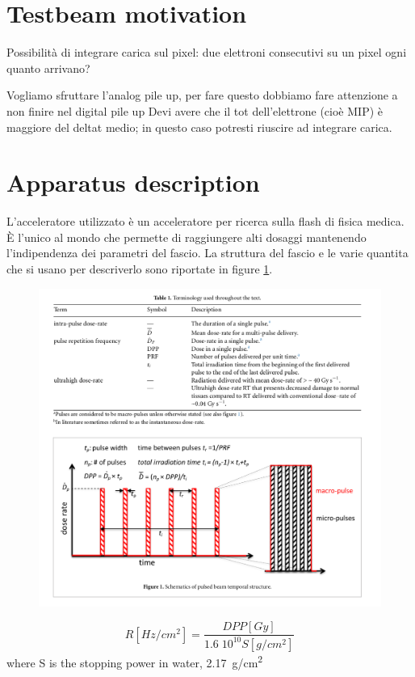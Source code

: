 \section{Testbeam motivation}
Possibilità di integrare carica sul pixel: due elettroni consecutivi su un pixel ogni quanto arrivano?

Vogliamo sfruttare l'analog pile up, per fare questo dobbiamo fare attenzione a non finire nel digital pile up
Devi avere che il tot dell'elettrone (cioè MIP) è maggiore del deltat medio; in questo caso potresti riuscire ad integrare carica.


\section{Apparatus description}
L'acceleratore utilizzato è un acceleratore per ricerca sulla flash di fisica medica. È l'unico al mondo che permette di raggiungere alti dosaggi mantenendo l'indipendenza dei parametri del fascio. La struttura del fascio e le varie quantita che si usano per descriverlo sono riportate in figure \ref{fig:}.



\begin{figure}
    \centering
    \includegraphics[width=.98\linewidth]{figures/test_beam/dose_param.png}
    \caption{}
    \label{fig:}
 \end{figure}


 \begin{equation}
    R[Hz/cm^2] = \frac{DPP[Gy]}{1.6 \;10^{10} S[g/cm^2]}
 \end{equation}
 where S is the stopping power in water, \SI{2.17}{g/cm\squared}



